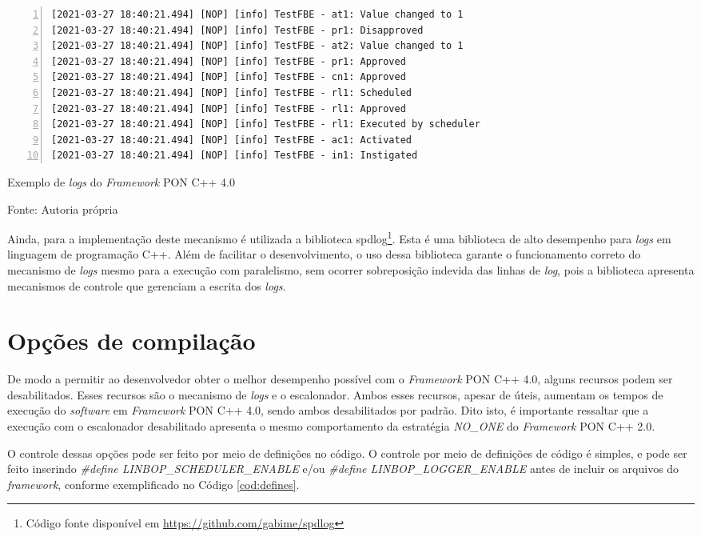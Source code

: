 \begin{table}[!htb]
    \begin{lstlisting}[numbers=left,
    stepnumber=1,frame=lines]
[2021-03-27 18:40:21.494] [NOP] [info] TestFBE - at1: Value changed to 1
[2021-03-27 18:40:21.494] [NOP] [info] TestFBE - pr1: Disapproved
[2021-03-27 18:40:21.494] [NOP] [info] TestFBE - at2: Value changed to 1
[2021-03-27 18:40:21.494] [NOP] [info] TestFBE - pr1: Approved
[2021-03-27 18:40:21.494] [NOP] [info] TestFBE - cn1: Approved
[2021-03-27 18:40:21.494] [NOP] [info] TestFBE - rl1: Scheduled
[2021-03-27 18:40:21.494] [NOP] [info] TestFBE - rl1: Approved
[2021-03-27 18:40:21.494] [NOP] [info] TestFBE - rl1: Executed by scheduler
[2021-03-27 18:40:21.494] [NOP] [info] TestFBE - ac1: Activated
[2021-03-27 18:40:21.494] [NOP] [info] TestFBE - in1: Instigated
\end{lstlisting}
    \caption{Exemplo de \textit{logs} do \textit{Framework} PON C++ 4.0}
    \caption*{Fonte: Autoria própria}
    \label{fig:log_fw4}
\end{table}

Ainda, para a implementação deste mecanismo é utilizada a biblioteca
spdlog\footnote{Código fonte disponível em
\url{https://github.com/gabime/spdlog}}. Esta é uma biblioteca de alto
desempenho para \textit{logs} em linguagem de programação C++. Além de facilitar
o desenvolvimento, o uso dessa biblioteca garante o funcionamento correto do
mecanismo de \textit{logs} mesmo para a execução com paralelismo, sem ocorrer
sobreposição indevida das linhas de \textit{log}, pois a biblioteca apresenta
mecanismos de controle que gerenciam a escrita dos \textit{logs}.

\section{Opções de compilação}

De modo a permitir ao desenvolvedor obter o melhor desempenho possível com o
\textit{Framework} PON C++ 4.0, alguns recursos podem ser desabilitados. Esses
recursos são o mecanismo de \textit{logs} e o escalonador. Ambos esses recursos,
apesar de úteis, aumentam os tempos de execução do \textit{software} em
\textit{Framework} PON C++ 4.0, sendo ambos desabilitados por padrão. Dito isto,
é importante ressaltar que a execução com o escalonador desabilitado apresenta o
mesmo comportamento da estratégia \textit{NO\_ONE} do \textit{Framework} PON C++
2.0.

O controle dessas opções pode ser feito por meio de definições no código. O
controle por meio de definições de código é simples, e pode ser feito inserindo
\textit{\#define LINBOP\_SCHEDULER\_ENABLE} e/ou \textit{\#define
LINBOP\_LOGGER\_ENABLE} antes de incluir os arquivos do \textit{framework},
conforme exemplificado no Código \ref{cod:defines}.

